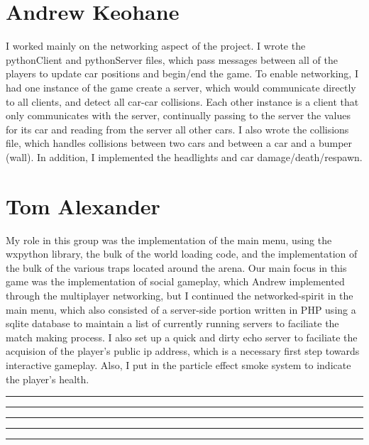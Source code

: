 \documentclass[12pt, letter]{article}
\begin{document}
\section*{Andrew Keohane}
\hspace{0.25in}I worked mainly on the networking aspect of the project. I wrote the pythonClient and pythonServer files, which pass messages between all of the players to update car positions and begin/end the game. To enable networking, I had one instance of the game create a server, which would communicate directly to all clients, and detect all car-car collisions. Each other instance is a client that only communicates with the server, continually passing to the server the values for its car and reading from the server all other cars. I also wrote the collisions file, which handles collisions between two cars and between a car and a bumper (wall). In addition, I implemented the headlights and car damage/death/respawn.
\section*{Tom Alexander}
\hspace{0.25in}My role in this group was the implementation of the main menu, using the wxpython library, the bulk of the world loading code, and the implementation of the bulk of the various traps located around the arena. Our main focus in this game was the implementation of social gameplay, which Andrew implemented through the multiplayer networking, but I continued the networked-spirit in the main menu, which also consisted of a server-side portion written in PHP using a sqlite database to maintain a list of currently running servers to faciliate the match making process. I also set up a quick and dirty echo server to faciliate the acquision of the player’s public ip address, which is a necessary first step towards interactive gameplay. Also, I put in the particle effect smoke system to indicate the player’s health.
\vspace{1in}
\hrule
\vspace{0.5in}
\hrule
\vspace{0.5in}
\hrule
\vspace{0.5in}
\hrule
\vspace{0.5in}
\hrule
\end{document}
